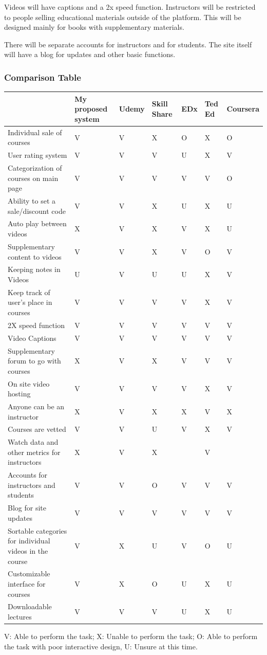 \documentclass{article}
\begin{document}
Videos will have captions and a 2x speed function. Instructors will be restricted to people selling educational materials outside of the platform. This will be designed mainly for books with supplementary materials.

There will be separate accounts for instructors and for students. The site itself will have a blog for updates and other basic functions. \vspace{\baselineskip}

\subsubsection{Comparison Table}
\begin{tabular}{ | m{10em} | m{2cm}| m{1cm} | m{1.5cm}| m{1cm} | m{1cm}| m{1.5cm} | } 
  \hline
   & My proposed system & Udemy & Skill Share & EDx & Ted Ed & Coursera\\ 
  \hline
  Individual sale of courses & V & V & X & O & X & O\\ 
  \hline
  User rating system & V & V & V & U & X & V \\ 
  \hline
  Categorization of courses on main page & V & V & V & V & V & O \\ 
  \hline
  Ability to set a sale/discount code & V & V & X & U & X & U \\ 
  \hline
  Auto play between videos & X & V & X & V & X & U \\ 
  \hline
  Supplementary content to videos & V & V & X & V & O & V \\ 
  \hline
  Keeping notes in Videos & U & V & U & U & X & V \\ 
  \hline
  Keep track of user's place in courses & V & V & V & V & X & V \\ 
  \hline
  2X speed function & V & V & V & V & V & V \\ 
  \hline
  Video Captions & V & V & V & V & V & V \\ 
  \hline
  Supplementary forum to go with courses & X & V & X & V & V & V \\ 
  \hline
  On site video hosting & V & V & V & V & X & V \\ 
  \hline
  Anyone can be an instructor & X & V & X & X & V & X \\ 
  \hline
  Courses are vetted & V & V & U & V & X & V \\ 
  \hline
  Watch data and other metrics for instructors & X & V & X & & V & \\ 
  \hline
  Accounts for instructors and students & V & V & O & V & V & V \\ 
  \hline
  Blog for site updates & V & V & V & V & V & V\\ 
  \hline
  Sortable categories for individual videos in the course & V & X & U & V & O & U \\ 
  \hline
  Customizable interface for courses & V & X & O & U & X & U \\ 
  \hline
  Downloadable lectures & V & V & V & U & X & U \\ 
  \hline
\end{tabular}
V: Able to perform the task; X: Unable to perform the task; O: Able to perform the task with poor interactive design, U: Unsure at this time.
\end{document}
